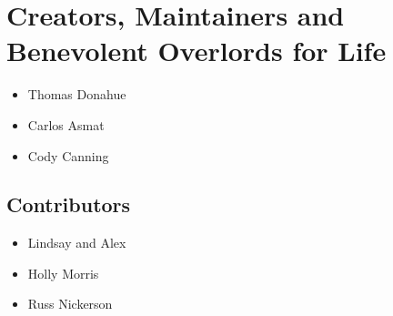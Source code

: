 \documentclass[11pt]{article}
\begin{document}
\section{Creators, Maintainers and Benevolent Overlords for Life}
\label{sec-3}
\begin{itemize}
\item Thomas Donahue
\item Carlos Asmat
\item Cody Canning
\end{itemize}

\subsection{Contributors}
\label{sec-3-1}
\begin{itemize}
\item Lindsay and Alex
\item Holly Morris
\item Russ Nickerson
\end{itemize}
\end{document}
